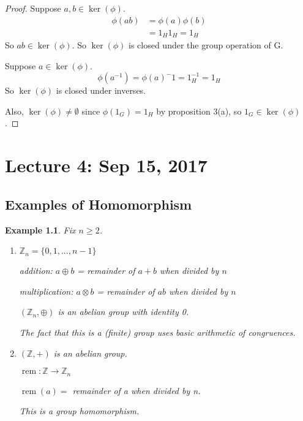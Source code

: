 \documentclass[11pt, oneside]{book}
\theoremstyle{break}
\newtheorem*{proof}{Proof}
\newtheorem{eg}{Example}[section]
\newcommand{\bb}[1]{\mathbb{#1}}			%
\DeclareMathOperator{\rem}{rem}
\begin{document}
\begin{proof}
    Suppose $a, b \in \ker(\phi)$.
    \begin{align*}
        \phi(ab) &= \phi(a)\phi(b) \\
                 &= 1_H 1_H = 1_H
    \end{align*}
    So $ab \in \ker(\phi)$. So $\ker(\phi)$ is closed under the group operation of G.

    Suppose $a \in \ker(\phi)$.
    \begin{equation*}
        \phi(a^{-1}) = \phi(a)^-1 = 1_H^{-1} = 1_H
    \end{equation*}
    So $\ker(\phi)$ is closed under inverses.

    Also, $\ker(\phi) \neq \emptyset$ since $\phi(1_G) = 1_H$ by proposition 3(a), so $1_G \in \ker(\phi)$.
\end{proof}

\chapter{Lecture 4: Sep 15, 2017}\label{lec4}

\section{Examples of Homomorphism}\label{eg_homomorphism}

\begin{eg}
    Fix $n \geq 2$.
    \begin{enumerate}
        \item $\bb{Z}_n = \{0, 1, ..., n - 1\}$

            addition: $a \oplus b$ = remainder of $a + b$ when divided by $n$

            multiplication: $a \otimes b$ = remainder of $ab$ when divided by $n$

            $(\bb{Z}_n , \oplus)$ is an abelian group with identity 0.

            The fact that this is a (finite) group uses basic arithmetic of congruences.

        \item $(\bb{Z} , +)$ is an abelian group.

            $\rem : \bb{Z} \to \bb{Z}_n$

            $\rem(a) = $ remainder of a when divided by n.

            This is a group homomorphism.
    \end{enumerate}
    
\end{eg}
\end{document}
